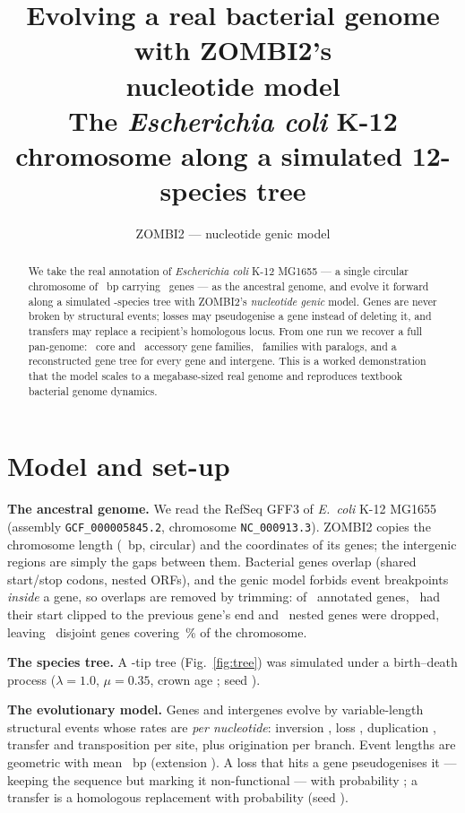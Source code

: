 \documentclass[11pt]{article}
\title{\vspace{-1.2cm}\textbf{Evolving a real bacterial genome with ZOMBI2's\\
nucleotide model}\\[2pt]
\large The \textit{Escherichia coli} K-12 chromosome along a simulated 12-species tree}
\author{ZOMBI2 --- nucleotide genic model}
\date{}
\begin{document}
\maketitle
\vspace{-0.8cm}

\begin{abstract}\noindent
We take the real annotation of \textit{Escherichia coli} K-12 MG1655 --- a single circular
chromosome of \EcChromLen~bp carrying \EcGenes~genes --- as the ancestral genome, and evolve it
forward along a simulated \EcNtips-species tree with ZOMBI2's \emph{nucleotide genic} model. Genes
are never broken by structural events; losses may pseudogenise a gene instead of deleting it, and
transfers may replace a recipient's homologous locus. From one run we recover a full pan-genome:
\EcCore~core and \EcAccessory~accessory gene families, \EcDuplicated~families with paralogs, and a
reconstructed gene tree for every gene and intergene. This is a worked demonstration that the model
scales to a megabase-sized real genome and reproduces textbook bacterial genome dynamics.
\end{abstract}

\section{Model and set-up}

\textbf{The ancestral genome.} We read the RefSeq GFF3 of \textit{E.\ coli} K-12 MG1655
(assembly \texttt{GCF\_000005845.2}, chromosome \texttt{NC\_000913.3}). ZOMBI2 copies the
chromosome length (\EcChromLen~bp, circular) and the coordinates of its genes; the intergenic
regions are simply the gaps between them. Bacterial genes overlap (shared start/stop codons, nested
ORFs), and the genic model forbids event breakpoints \emph{inside} a gene, so overlaps are removed by
trimming: of \EcRawGenes~annotated genes, \EcTrimmed~had their start clipped to the previous gene's
end and \EcDropped~nested genes were dropped, leaving \EcGenes~disjoint genes covering
\EcGenicFrac\,\% of the chromosome.

\textbf{The species tree.} A \EcNtips-tip tree (Fig.~\ref{fig:tree}) was simulated under a
birth--death process ($\lambda=1.0$, $\mu=0.35$, crown age \EcAge; seed \EcTreeSeed).

\textbf{The evolutionary model.} Genes and intergenes evolve by variable-length structural events
whose rates are \emph{per nucleotide}: inversion \EcInvR, loss \EcLossR, duplication \EcDupR,
transfer \EcTransR{} and transposition \EcTranspR{} per site, plus origination \EcOrigR{} per branch.
Event lengths are geometric with mean \EcMeanEvLen~bp (extension \EcExt). A loss that hits a gene
pseudogenises it --- keeping the sequence but marking it non-functional --- with probability
\EcPseudoP; a transfer is a homologous replacement with probability \EcReplP{} (seed \EcSimSeed).
\end{document}
